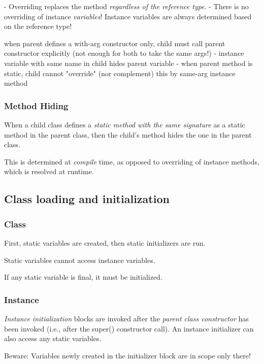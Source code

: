 \documentclass{scrartcl}
\begin{document}
    - Overriding replaces the method \textit{regardless of the reference type}.
    - There is no overriding of instance \textit{variables}! Instance variables are always determined based on the reference type!

    when parent defines a with-arg constructor only, child must call parent constructor
    explicitly (not enough for both to take the same args!)
    - instance variable with same name in child hides parent variable
    - when parent method is static, child cannot "override" (nor complement) this
    by same-arg instance method

\subsubsection{Method Hiding}

    When a child class defines a \textit{static method with the same signature} as a static method in the parent class, then the child’s method hides the one in the parent class.

    This is determined at \textit{compile} time, as opposed to overriding of instance methods, which is resolved at runtime.

\subsection{Class loading and initialization}
\subsubsection{Class}

    First, static variables are created, then static initializers are run.

    Static variables cannot access instance variables.

    If any static variable is final, it must be initialized.

\subsubsection{Instance}

    \textit{Instance initialization} blocks are invoked after the \textit{parent class constructor} has been invoked (i.e., after the super() constructor call).
    An instance initializer can also access any static variables.

    Beware: Variables newly created in the initializer block are in scope only there!
\end{document}
